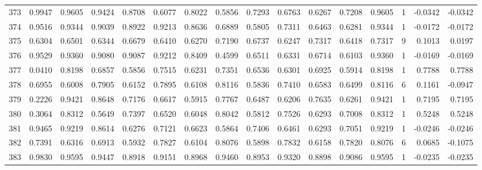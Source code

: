 \begin{tabular}{lrrrrrrrrrrrrrrr}
373 &      0.9947 &  0.9605 &  0.9424 &  0.8708 &  0.6077 &  0.8022 &  0.5856 &  0.7293 &  0.6763 &  0.6267 &   0.7208 &     0.9605 &      1 &                   -0.0342 &                    -0.0342 \\
374 &      0.9516 &  0.9344 &  0.9039 &  0.8922 &  0.9213 &  0.8636 &  0.6889 &  0.5805 &  0.7311 &  0.6463 &   0.6281 &     0.9344 &      1 &                   -0.0172 &                    -0.0172 \\
375 &      0.6304 &  0.6501 &  0.6344 &  0.6679 &  0.6410 &  0.6270 &  0.7190 &  0.6737 &  0.6247 &  0.7317 &   0.6418 &     0.7317 &      9 &                    0.1013 &                     0.0197 \\
376 &      0.9529 &  0.9360 &  0.9080 &  0.9087 &  0.9212 &  0.8409 &  0.4599 &  0.6511 &  0.6331 &  0.6714 &   0.6103 &     0.9360 &      1 &                   -0.0169 &                    -0.0169 \\
377 &      0.0410 &  0.8198 &  0.6857 &  0.5856 &  0.7515 &  0.6231 &  0.7351 &  0.6536 &  0.6301 &  0.6925 &   0.5914 &     0.8198 &      1 &                    0.7788 &                     0.7788 \\
378 &      0.6955 &  0.6008 &  0.7905 &  0.6152 &  0.7895 &  0.6108 &  0.8116 &  0.5836 &  0.7410 &  0.6583 &   0.6499 &     0.8116 &      6 &                    0.1161 &                    -0.0947 \\
379 &      0.2226 &  0.9421 &  0.8648 &  0.7176 &  0.6617 &  0.5915 &  0.7767 &  0.6487 &  0.6206 &  0.7635 &   0.6261 &     0.9421 &      1 &                    0.7195 &                     0.7195 \\
380 &      0.3064 &  0.8312 &  0.5649 &  0.7397 &  0.6520 &  0.6048 &  0.8042 &  0.5812 &  0.7526 &  0.6293 &   0.7008 &     0.8312 &      1 &                    0.5248 &                     0.5248 \\
381 &      0.9465 &  0.9219 &  0.8614 &  0.6276 &  0.7121 &  0.6623 &  0.5864 &  0.7406 &  0.6461 &  0.6293 &   0.7051 &     0.9219 &      1 &                   -0.0246 &                    -0.0246 \\
382 &      0.7391 &  0.6316 &  0.6913 &  0.5932 &  0.7827 &  0.6104 &  0.8076 &  0.5898 &  0.7832 &  0.6158 &   0.7820 &     0.8076 &      6 &                    0.0685 &                    -0.1075 \\
383 &      0.9830 &  0.9595 &  0.9447 &  0.8918 &  0.9151 &  0.8968 &  0.9460 &  0.8953 &  0.9320 &  0.8898 &   0.9086 &     0.9595 &      1 &                   -0.0235 &                    -0.0235 \\

\end{tabular}

